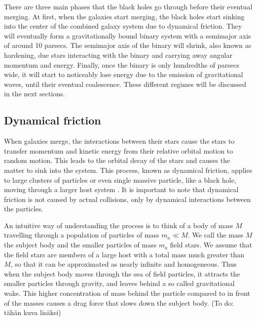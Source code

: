 \documentclass[english, oneside]{HYgradu}
\begin{document}
There are three main phases that the black holes go through before their eventual merging. At first, when the galaxies start merging, the black holes start sinking into the center of the combined galaxy system due to dynamical friction. They will eventually form a gravitationally bound binary system with a semimajor axis of around 10 parsecs. The semimajor axis of the binary will shrink, also known as hardening, due stars interacting with the binary and carrying away angular momentum and energy. Finally, once the binary is only hundredths of parsecs wide, it will start to noticeably lose energy due to the emission of gravitational waves, until their eventual coalescence. These different regimes will be discussed in the next sections.


\subsection{Dynamical friction}

When galaxies merge, the interactions between their stars cause the stars to transfer momentum and kinetic energy from their relative orbital motion to random motion. This leads to the orbital decay of the stars and causes the matter to sink into the system. This process, known as dynamical friction, applies to large clusters of particles or even single massive particle, like a black hole, moving through a larger host system \citep{bt-galdyn}. It is important to note that dynamical friction is not caused by actual collisions, only by dynamical interactions between the particles.

An intuitive way of understanding the process is to think of a body of mass $M$ travelling through a population of particles of mass $m_a \ll M$. We call the mass $M$ the subject body and the smaller particles of mass $m_a$ field stars. We assume that the field stars are members of a large host with a total mass much greater than $M$, so that it can be approximated as nearly infinite and homogeneous. Thus when the subject body moves through the sea of field particles, it attracts the smaller particles through gravity, and leaves behind a so called gravitational wake. This higher concentration of mass behind the particle compared to in front of the masses causes a drag force that slows down the subject body. (To do: tähän kuva lisäksi)
\end{document}
